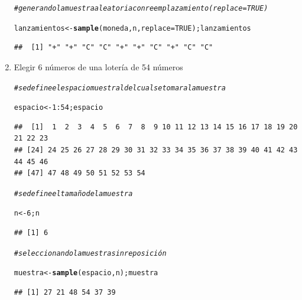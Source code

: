 \documentclass[12pt,letterpaper]{article}\usepackage[]{graphicx}\usepackage[]{color}
\makeatletter
\newcommand{\hlnum}[1]{\textcolor[rgb]{0.686,0.059,0.569}{#1}}%
\newcommand{\hlcom}[1]{\textcolor[rgb]{0.678,0.584,0.686}{\textit{#1}}}%
\newcommand{\hlopt}[1]{\textcolor[rgb]{0,0,0}{#1}}%
\newcommand{\hlstd}[1]{\textcolor[rgb]{0.345,0.345,0.345}{#1}}%
\newcommand{\hlkwb}[1]{\textcolor[rgb]{0.69,0.353,0.396}{#1}}%
\newcommand{\hlkwc}[1]{\textcolor[rgb]{0.333,0.667,0.333}{#1}}%
\newcommand{\hlkwd}[1]{\textcolor[rgb]{0.737,0.353,0.396}{\textbf{#1}}}%
\newenvironment{kframe}{%
 \def\at@end@of@kframe{}%
 \ifinner\ifhmode%
  \def\at@end@of@kframe{\end{minipage}}%
  \begin{minipage}{\columnwidth}%
 \fi\fi%
 \def\FrameCommand##1{\hskip\@totalleftmargin \hskip-\fboxsep
 \colorbox{shadecolor}{##1}\hskip-\fboxsep
     \hskip-\linewidth \hskip-\@totalleftmargin \hskip\columnwidth}%
 \MakeFramed {\advance\hsize-\width
   \@totalleftmargin\z@ \linewidth\hsize
   \@setminipage}}%
 {\par\unskip\endMakeFramed%
 \at@end@of@kframe}
\newenvironment{knitrout}{}{} %
\makeatother
\begin{document}
\begin{enumerate}
\begin{knitrout}
\color{fgcolor}\begin{kframe}
\begin{alltt}
\hlcom{#generando la muestra aleatoria con reemplazamiento (replace=TRUE)}

\hlstd{lanzamientos} \hlkwb{<-} \hlkwd{sample}\hlstd{(moneda, n,} \hlkwc{replace}\hlstd{=}\hlnum{TRUE}\hlstd{); lanzamientos}
\end{alltt}
\begin{verbatim}
##  [1] "+" "+" "C" "C" "+" "+" "C" "+" "C" "C"
\end{verbatim}
\end{kframe}
\end{knitrout}

\item Elegir 6 n\'umeros de una loter\'ia de 54 n\'umeros 

\begin{knitrout}
\color{fgcolor}\begin{kframe}
\begin{alltt}
\hlcom{# se define el espacio muestral del cual se tomara la muestra}

\hlstd{espacio} \hlkwb{<-} \hlnum{1}\hlopt{:}\hlnum{54}\hlstd{;espacio}
\end{alltt}
\begin{verbatim}
##  [1]  1  2  3  4  5  6  7  8  9 10 11 12 13 14 15 16 17 18 19 20 21 22 23
## [24] 24 25 26 27 28 29 30 31 32 33 34 35 36 37 38 39 40 41 42 43 44 45 46
## [47] 47 48 49 50 51 52 53 54
\end{verbatim}
\begin{alltt}
\hlcom{# se define el tamaño de la muestra}

\hlstd{n} \hlkwb{<-} \hlnum{6}\hlstd{; n}
\end{alltt}
\begin{verbatim}
## [1] 6
\end{verbatim}
\end{kframe}
\end{knitrout}

\begin{knitrout}
\color{fgcolor}\begin{kframe}
\begin{alltt}
\hlcom{# seleccionando la muestra sin reposición}

\hlstd{muestra} \hlkwb{<-} \hlkwd{sample}\hlstd{(espacio, n); muestra}
\end{alltt}
\begin{verbatim}
## [1] 27 21 48 54 37 39
\end{verbatim}
\end{kframe}
\end{knitrout}


\end{enumerate}
\end{document}

